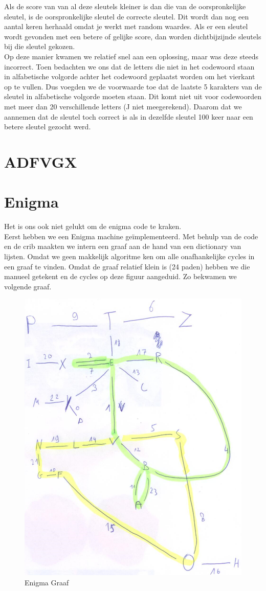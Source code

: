\documentclass{article}
\begin{document}
	Als de score van van al deze sleutels kleiner is dan die van de oorspronkelijke sleutel, is de oorspronkelijke sleutel de correcte sleutel. Dit wordt dan nog een aantal keren herhaald omdat je werkt met random waardes. Als er een sleutel wordt gevonden met een betere of gelijke score, dan worden dichtbijzijnde sleutels bij die sleutel gekozen.\\
	Op deze manier kwamen we relatief snel aan een oplossing, maar was deze steeds incorrect. Toen bedachten we ons dat de letters die niet in het codewoord staan in alfabetische volgorde achter het codewoord geplaatst worden om het vierkant op te vullen. Dus voegden we de voorwaarde toe dat de laatste 5 karakters van de sleutel in alfabetische volgorde moeten staan. Dit komt niet uit voor codewoorden met meer dan 20 verschillende letters (J niet meegerekend). Daarom dat we aannemen dat de sleutel toch correct is als in dezelfde sleutel 100 keer naar een betere sleutel gezocht werd.
	\section{ADFVGX}
	\section{Enigma}
	Het is ons ook niet gelukt om de enigma code te kraken.\\
	Eerst hebben we een Enigma machine ge\"{i}mplementeerd. Met behulp van de code en de crib maakten we intern een graaf aan de hand van een dictionary van lijsten. Omdat we geen makkelijk algoritme ken om alle onafhankelijke cycles in een graaf te vinden. Omdat de graaf relatief klein is (24 paden) hebben we die manueel getekent en de cycles op deze figuur aangeduid. Zo bekwamen we volgende graaf. 
	\begin{figure}[h!]
		\centering
		\includegraphics[width=0.5\linewidth]{Enigma}
		\caption[]{Enigma Graaf}
		\label{fig:enigma}
	\end{figure}
\end{document}
